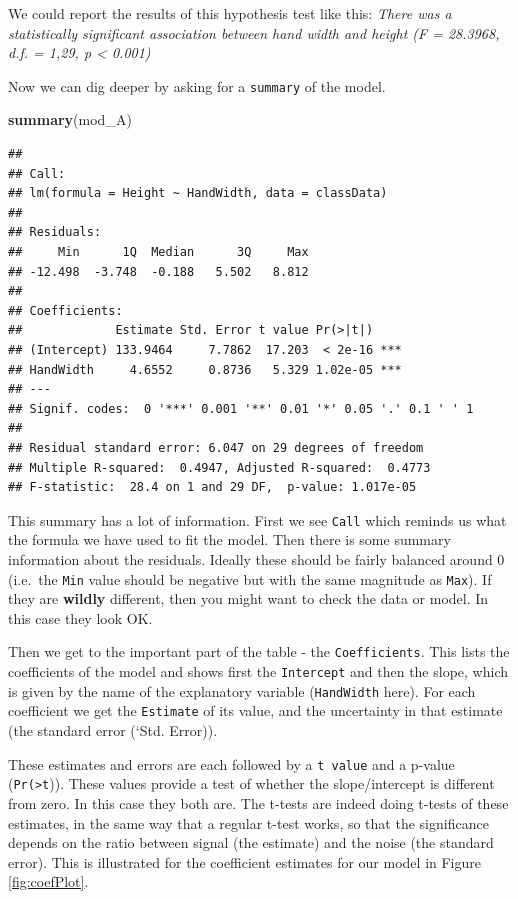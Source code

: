 \documentclass[
  a4paperpaper,
]{book}
\newenvironment{Shaded}{\begin{snugshade}}{\end{snugshade}}
\newcommand{\KeywordTok}[1]{\textcolor[rgb]{0.13,0.29,0.53}{\textbf{#1}}}
\newcommand{\NormalTok}[1]{#1}
\begin{document}
We could report the results of this hypothesis test like this:
\emph{There was a statistically significant association between hand width and height (F = 28.3968, d.f. = 1,29, p \textless{} 0.001)}

Now we can dig deeper by asking for a \texttt{summary} of the model.

\begin{Shaded}
\begin{Highlighting}[]
\KeywordTok{summary}\NormalTok{(mod\_A)}
\end{Highlighting}
\end{Shaded}

\begin{verbatim}
## 
## Call:
## lm(formula = Height ~ HandWidth, data = classData)
## 
## Residuals:
##     Min      1Q  Median      3Q     Max 
## -12.498  -3.748  -0.188   5.502   8.812 
## 
## Coefficients:
##             Estimate Std. Error t value Pr(>|t|)    
## (Intercept) 133.9464     7.7862  17.203  < 2e-16 ***
## HandWidth     4.6552     0.8736   5.329 1.02e-05 ***
## ---
## Signif. codes:  0 '***' 0.001 '**' 0.01 '*' 0.05 '.' 0.1 ' ' 1
## 
## Residual standard error: 6.047 on 29 degrees of freedom
## Multiple R-squared:  0.4947,	Adjusted R-squared:  0.4773 
## F-statistic:  28.4 on 1 and 29 DF,  p-value: 1.017e-05
\end{verbatim}

This summary has a lot of information. First we see \texttt{Call} which reminds us what the formula we have used to fit the model. Then there is some summary information about the residuals. Ideally these should be fairly balanced around 0 (i.e.~the \texttt{Min} value should be negative but with the same magnitude as \texttt{Max}). If they are \textbf{wildly} different, then you might want to check the data or model. In this case they look OK.

Then we get to the important part of the table - the \texttt{Coefficients}. This lists the coefficients of the model and shows first the \texttt{Intercept} and then the slope, which is given by the name of the explanatory variable (\texttt{HandWidth} here). For each coefficient we get the \texttt{Estimate} of its value, and the uncertainty in that estimate (the standard error (`Std. Error)).

These estimates and errors are each followed by a \texttt{t\ value} and a p-value (\texttt{Pr(\textgreater{}\textbar{}t\textbar{}})). These values provide a test of whether the slope/intercept is different from zero. In this case they both are. The t-tests are indeed doing t-tests of these estimates, in the same way that a regular t-test works, so that the significance depends on the ratio between signal (the estimate) and the noise (the standard error). This is illustrated for the coefficient estimates for our model in Figure \ref{fig:coefPlot}.
\end{document}
